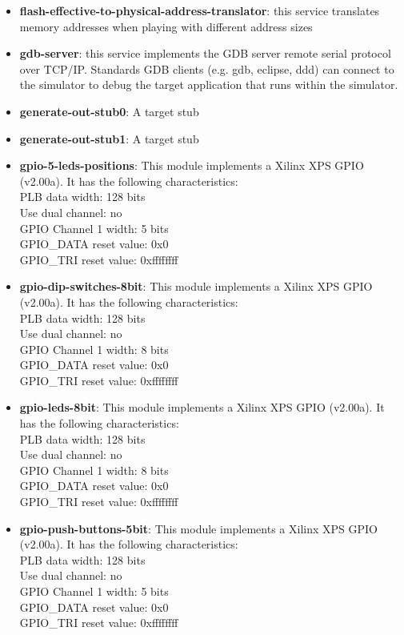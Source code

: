 \begin{itemize}
\item \textbf{flash-effective-to-physical-address-translator}: this service translates memory addresses when playing with different address sizes
\item \textbf{gdb-server}: this service implements the GDB server remote serial protocol over TCP/IP. Standards GDB clients (e.g. gdb, eclipse, ddd) can connect to the simulator to debug the target application that runs within the simulator.
\item \textbf{generate-out-stub0}: A target stub
\item \textbf{generate-out-stub1}: A target stub
\item \textbf{gpio-5-leds-positions}: This module implements a Xilinx XPS GPIO (v2.00a). It has the following characteristics:\\
PLB data width: 128 bits\\
Use dual channel: no\\
GPIO Channel 1 width: 5 bits\\
GPIO\_DATA reset value: 0x0\\
GPIO\_TRI reset value: 0xffffffff\\

\item \textbf{gpio-dip-switches-8bit}: This module implements a Xilinx XPS GPIO (v2.00a). It has the following characteristics:\\
PLB data width: 128 bits\\
Use dual channel: no\\
GPIO Channel 1 width: 8 bits\\
GPIO\_DATA reset value: 0x0\\
GPIO\_TRI reset value: 0xffffffff\\

\item \textbf{gpio-leds-8bit}: This module implements a Xilinx XPS GPIO (v2.00a). It has the following characteristics:\\
PLB data width: 128 bits\\
Use dual channel: no\\
GPIO Channel 1 width: 8 bits\\
GPIO\_DATA reset value: 0x0\\
GPIO\_TRI reset value: 0xffffffff\\

\item \textbf{gpio-push-buttons-5bit}: This module implements a Xilinx XPS GPIO (v2.00a). It has the following characteristics:\\
PLB data width: 128 bits\\
Use dual channel: no\\
GPIO Channel 1 width: 5 bits\\
GPIO\_DATA reset value: 0x0\\
GPIO\_TRI reset value: 0xffffffff\\


\end{itemize}
